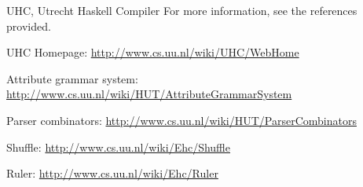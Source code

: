 \begin{hcarentry}{UHC, Utrecht Haskell Compiler}
For more information, see the references provided.

\FurtherReading
\begin{compactitem}
\item UHC Homepage:
\url{http://www.cs.uu.nl/wiki/UHC/WebHome}

\item Attribute grammar system:
\url{http://www.cs.uu.nl/wiki/HUT/AttributeGrammarSystem}

\item Parser combinators:
\url{http://www.cs.uu.nl/wiki/HUT/ParserCombinators}

\item Shuffle:
\url{http://www.cs.uu.nl/wiki/Ehc/Shuffle}

\item Ruler:
\url{http://www.cs.uu.nl/wiki/Ehc/Ruler}


\end{compactitem}
\end{hcarentry}
